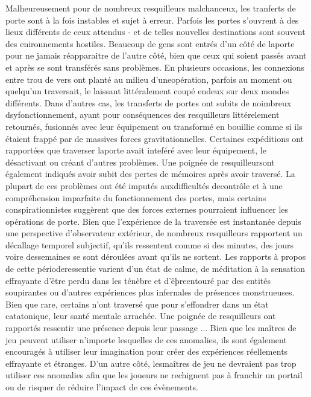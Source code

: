 Malheureusement pour de nombreux resquilleurs malchanceux, les tranferts de porte sont à la fois instables et sujet à erreur. Parfois les portes s'ouvrent à des lieux différents de ceux attendus - et de telles nouvelles destinations sont souvent des enironnements hostiles. Beaucoup de gens sont entrés d'un côté de laporte pour ne jamais réapparaitre de l'autre côté, bien que ceux qui soient passés avant et après se sont transférés sans problèmes. En plusieurs occasions, les connexions entre trou de vers ont planté au milieu d'uneopération, parfois au moment ou quelqu'un traversait, le laissant littéralement coupé endeux sur deux mondes différents. Dans d'autres cas, les transferts de portes ont subits de noimbreux dsyfonctionnement, ayant pour conséquences des resquilleurs littérelement retournés, fusionnés avec leur équipement ou transformé en bouillie comme si ils étaient frappé par de massives forces gravitationnelles. Certaines expéditions ont rapportées que traverser laporte avait inteféré avec leur équipement, le désactivant ou créant d'autres problèmes. Une poignée de resquilleursont également indiqués avoir subit des pertes de mémoires après avoir traversé. La plupart de ces problèmes ont été imputés auxdifficultés decontrôle et à une compréhension imparfaite du fonctionnement des portes, mais certains conspirationnistes suggèrent que des forces externes pourraient influencer les opérations de porte. Bien que l'expérience de la traversée est instantanée depuis une perspective d'observateur extérieur, de nombreux resquilleurs rapportent un décallage temporel subjectif, qu'ils ressentent comme si des minutes, des jours voire dessemaines se sont déroulées avant qu'ils ne sortent. Les rapports à propos de cette périoderessentie varient d'un état de calme, de méditation à la sensation effrayante d'être perdu dans les ténèbre et d'êþreentouré par des entités soupirantes ou d'autres expériences plus infernales de présences monstrueuses. Bien que rare, certains n'ont traversé que pour s'effondrer dans un état catatonique, leur santé mentale arrachée. Une poignée de resquilleurs ont rapportés ressentir une présence depuis leur passage ... Bien que les maîtres de jeu peuvent utiliser n'importe lesquelles de ces anomalies, ils sont également encouragés à utiliser leur imagination pour créer des expériences réellements effrayante et étranges. D'un autre côté, lesmaîtres de jeu ne devraient pas trop utiliser ces anomalies afin que les joueurs ne rechignent pas à franchir un portail ou de risquer de réduire l'impact de ces évènements. 

